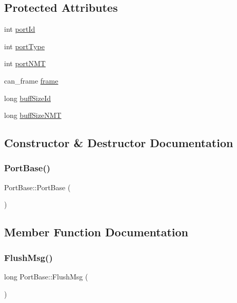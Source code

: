 \subsection*{Protected Attributes}
\begin{DoxyCompactItemize}
\item 
int \hyperlink{classPortBase_af8816a6f73bf391d2948f3564f8ea1df}{port\+Id}
\item 
int \hyperlink{classPortBase_a6f18d480ef41a91fd2957927fe94c408}{port\+Type}
\item 
int \hyperlink{classPortBase_ae63f6df54bbeac1046b5dfbe178e1cee}{port\+N\+MT}
\item 
can\+\_\+frame \hyperlink{classPortBase_ae175156fa18f3be1820adea89ef7b13c}{frame}
\item 
long \hyperlink{classPortBase_a559431268076ea9b23bce545510f7b39}{buff\+Size\+Id}
\item 
long \hyperlink{classPortBase_aba8241e5d55c06c7d1a11ebb18096328}{buff\+Size\+N\+MT}
\end{DoxyCompactItemize}


\subsection{Constructor \& Destructor Documentation}
\mbox{\label{classPortBase_acb7872550bc94538ef95d2510d763be3}} 
\subsubsection{\texorpdfstring{Port\+Base()}{PortBase()}}
{\footnotesize\ttfamily Port\+Base\+::\+Port\+Base (\begin{DoxyParamCaption}{ }\end{DoxyParamCaption})}



\subsection{Member Function Documentation}
\mbox{\label{classPortBase_a913932fc850e9aebc947542773c669ad}} 
\subsubsection{\texorpdfstring{Flush\+Msg()}{FlushMsg()}}
{\footnotesize\ttfamily long Port\+Base\+::\+Flush\+Msg (\begin{DoxyParamCaption}{ }\end{DoxyParamCaption})}

